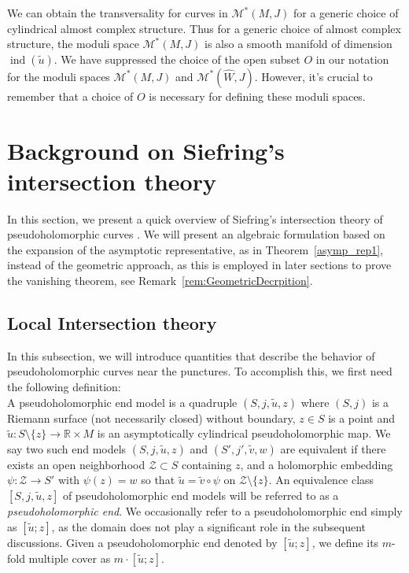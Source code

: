 \documentclass[11pt, a4paper]{amsart}
\newcommand{\cM}{\mathcal{M}}
\newcommand{\cZ}{\mathcal{Z}}
\DeclareMathOperator{\ind}{ind}
\begin{document}
We can obtain the transversality for curves in $\cM^*(M,J)$ for a generic choice of cylindrical almost complex structure. Thus for a generic choice of almost complex structure, the moduli space $\cM^*(M,J)$ is also a smooth manifold of dimension $\ind(\tilde{u})$. We have suppressed the choice of the open subset $O$ in our notation for the moduli spaces $\cM^*(M,J)$ and $\cM^*(\widehat{W},J)$. However, it's crucial to remember that a choice of $O$ is necessary for defining these moduli spaces.


\section{Background on Siefring's intersection theory} \label{section: intersection theory}
In this section, we present a quick overview of Siefring's intersection theory of pseudoholomorphic curves \cite{Siefinter2009}. We will present an algebraic formulation based on the expansion of the asymptotic representative, as in Theorem~\ref{asymp_rep1}, instead of the geometric approach, as this is employed in later sections to prove the vanishing theorem, see Remark~\ref{rem:GeometricDecrpition}.



\subsection{Local Intersection theory}

In this subsection, we will introduce quantities that describe the behavior of pseudoholomorphic curves near the punctures. To accomplish this, we first need the following definition:\\

A pseudoholomorphic end model is a quadruple $(S,j,\tilde{u},z)$ where $(S,j)$ is a Riemann surface (not necessarily closed) without boundary, $z\in S$ is a point and $\tilde{u}:S \setminus \{z\} \rightarrow \mathbb{R}\times M$ is an asymptotically cylindrical pseudoholomorphic map. We say two such end models $(S,j,\tilde{u},z)$ and $(S',j',\tilde{v},w)$ are equivalent if there exists an open neighborhood  $\cZ\subset S$ containing $z$, and a holomorphic embedding $\psi : \cZ \rightarrow S'$ with $\psi(z)=w$ so that $\tilde{u}=\tilde{v}\circ \psi$ on $\cZ \setminus \{z\}$. An equivalence class $[S,j,\tilde{u},z]$ of pseudoholomorphic end models will be referred to as a \textit{pseudoholomorphic end}. We occasionally refer to a pseudoholomorphic end simply as $[\tilde{u}; z]$, as the domain does not play a significant role in the subsequent discussions. Given a pseudoholomorphic end denoted by $[\tilde{u}; z]$, we define its $m$-fold multiple cover as $m \cdot [\tilde{u}; z]$.\\
\end{document}
